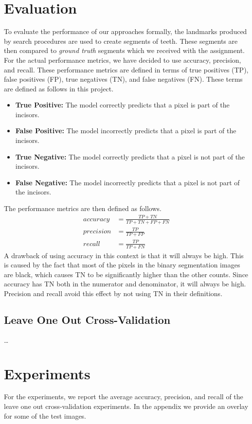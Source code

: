 \documentclass[a4paper]{article}
\begin{document}
\section{Evaluation}
\label{sect:evaluation}
To evaluate the performance of our approaches formally, the landmarks produced by search procedures are used to create segments of teeth.
These segments are then compared to \textit{ground truth} segments which we received with the assignment.
For the actual performance metrics, we have decided to use accuracy, precision, and recall.
These performance metrics are defined in terms of true positives (TP), false positives (FP), true negatives (TN), and false negatives (FN).
These terms are defined as follows in this project.
\begin{itemize}
\item \textbf{True Positive:} The model correctly predicts that a pixel is part of the incisors.
\item \textbf{False Positive:} The model incorrectly predicts that a pixel is part of the incisors.
\item \textbf{True Negative:} The model correctly predicts that a pixel is not part of the incisors.
\item \textbf{False Negative:} The model incorrectly predicts that a pixel is not part of the incisors.
\end{itemize}

The performance metrics are then defined as follows.
\begin{align} 
accuracy &= \frac{TP + TN}{TP + TN + FP + FN} \\ 
precision &= \frac{TP}{TP + FP} \\ 
recall &= \frac{TP}{TP + FN}
\end{align}
A drawback of using accuracy in this context is that it will always be high.
This is caused by the fact that most of the pixels in the binary segmentation images are black, which causes TN to be significantly higher than the other counts.
Since accuracy has TN both in the numerator and denominator, it will always be high.
Precision and recall avoid this effect by not using TN in their definitions.

\subsection{Leave One Out Cross-Validation}
\ldots



\section{Experiments}
\label{sect:experiments}
For the experiments, we report the average accuracy, precision, and recall of the leave one out cross-validation experiments.
In the appendix we provide an overlay for some of the test images.
\end{document}
